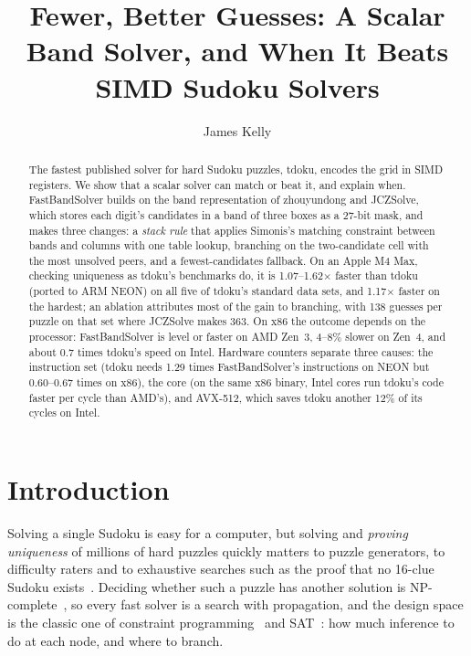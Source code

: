 \documentclass[a4paper,USenglish,cleveref,anonymous]{lipics-v2021}
\title{Fewer, Better Guesses: A Scalar Band Solver, and When It Beats SIMD Sudoku Solvers}
\author{James Kelly}{Independent researcher, USA}{}{}{}
\begin{document}
\maketitle

\begin{abstract}
The fastest published solver for hard Sudoku puzzles, tdoku, encodes the grid in SIMD registers. We show that a
scalar solver can match or beat it, and explain when. FastBandSolver builds on the band representation of
zhouyundong and JCZSolve, which stores each digit's candidates in a band of three boxes as a 27-bit mask, and makes
three changes: a \emph{stack rule} that applies Simonis's matching constraint between bands and columns with one table
lookup, branching on the two-candidate cell with the most unsolved peers, and a fewest-candidates fallback. On an
Apple M4 Max, checking uniqueness as tdoku's benchmarks do, it is 1.07--1.62$\times$ faster than tdoku (ported to ARM
NEON) on all five of tdoku's standard data sets, and 1.17$\times$ faster on the hardest; an ablation attributes most of
the gain to branching, with 138 guesses per puzzle on that set where JCZSolve makes 363. On x86 the outcome depends on
the processor: FastBandSolver is level or faster on AMD Zen~3, 4--8\% slower on Zen~4, and about 0.7 times tdoku's
speed on Intel. Hardware counters separate three causes: the instruction set (tdoku needs 1.29 times FastBandSolver's
instructions on NEON but 0.60--0.67 times on x86), the core (on the same x86 binary, Intel cores run tdoku's code
faster per cycle than AMD's), and AVX-512, which saves tdoku another 12\% of its cycles on Intel.
\end{abstract}

\section{Introduction}
\label{sec:intro}

Solving a single Sudoku is easy for a computer, but solving and \emph{proving uniqueness} of millions of hard
puzzles quickly matters to puzzle generators, to difficulty raters and to exhaustive searches such as the proof
that no 16-clue Sudoku exists~\cite{mcguire2014sixteen}. Deciding whether such a puzzle has another solution is
NP-complete~\cite{yato2003complexity}, so every fast solver is a search with propagation, and the design space is the
classic one of constraint programming~\cite{simonis2005sudoku} and SAT~\cite{lynce2006sudoku}: how much inference to do
at each node, and where to branch.
\end{document}
